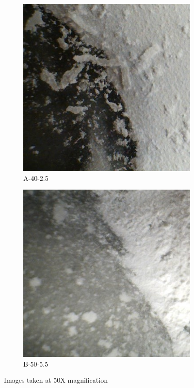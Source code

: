\begin{figure}[H]
\centering
\begin{subfigure}{.11\textwidth}
  \centering
  \includegraphics[width=1\linewidth]{Sections/Figures/A_Opt.jpg}
  \caption{A-40-2.5}
  \label{fig:sub1}
\end{subfigure}%
\begin{subfigure}{.11\textwidth}
  \centering
  \includegraphics[width=1\linewidth]{Sections/Figures/B_opt.jpg}
  \caption{B-50-5.5}
  \label{fig:sub2}
\end{subfigure}
\caption{Images taken at 50X magnification}
\label{fig:test}
\label{abrased}
\end{figure}
\newpage

